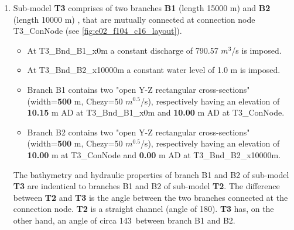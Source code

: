 \begin{enumerate}
		\Note The bathymetry and hydraulic properties of branch B1 and B2 of sub-model \textbf{\textcolor[rgb]{1,0,0}{T2}} are indentical to those branch B1 of sub-model \textbf{\textcolor[rgb]{1,0,0}{T1}}. \\
	
	\item Sub-model \textbf{\textcolor[rgb]{1,0,0}{T3}} comprises of two branches \textbf{B1} (length 15000 m) and \textbf{B2} (length 10000 m) , that are mutually connected at connection node T3\_ConNode (see \autoref{fig:e02_f104_c16_layout}).
		\begin{itemize}
			\item At T3\_Bnd\_B1\_x0m a constant discharge of 790.57 $m^3$/s is imposed.
			\item At T3\_Bnd\_B2\_x10000m a constant water level of 1.0 m is imposed.
			\item Branch B1 contains two "open Y-Z rectangular cross-sections" (width=\textbf{\textcolor[rgb]{0.5,0,0.15}{500}} m, Chezy=50 $m^{0.5}$/s), respectively having an elevation of \textbf{10.15} m AD at T3\_Bnd\_B1\_x0m and \textbf{10.00} m AD at T3\_ConNode. 
			\item Branch B2 contains two "open Y-Z rectangular cross-sections" (width=\textbf{\textcolor[rgb]{0.5,0,0.15}{500}} m, Chezy=50 $m^{0.5}$/s), respectively having an elevation of \textbf{10.00} m at T3\_ConNode and \textbf{0.00} m AD at \newline T3\_Bnd\_B2\_x10000m.
		\end{itemize} 
			
		\Note The bathymetry and hydraulic properties of branch B1 and B2 of sub-model \textbf{\textcolor[rgb]{1,0,0}{T3}} are indentical to branches B1 and B2 of sub-model \textbf{\textcolor[rgb]{1,0,0}{T2}}. The difference between \textbf{\textcolor[rgb]{1,0,0}{T2}} and \textbf{\textcolor[rgb]{1,0,0}{T3}} is the angle between the two branches connected at the connection node. \textbf{\textcolor[rgb]{1,0,0}{T2}} is a straight channel (angle of 180\textdegree).  \textbf{\textcolor[rgb]{1,0,0}{T3}} has, on the other hand, an angle of circa 143\textdegree \, between branch B1 and B2.\\
	

\end{enumerate}
